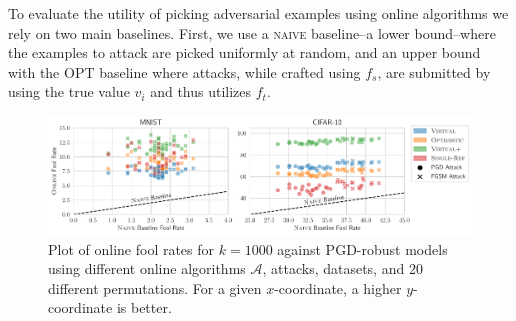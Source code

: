 {}

 To evaluate the utility of picking adversarial examples  using  online  algorithms  we  rely  on  two  main baselines. First, we use a \textsc{naive} baseline--a lower bound--where the examples to attack are picked uniformly at random, and an upper bound with the \textsc{OPT} baseline where attacks, while crafted using $f_s$, are submitted by using the true value $v_i$ and thus utilizes $f_t$.%
\setlength{\textfloatsep}{5pt}%
\begin{figure}[t]
    \centering
    \includegraphics[width=.9\linewidth]{Figures/scatterplot_Q1.pdf}
    \caption{ \small
    Plot of online fool rates for $k=1000$ against PGD-robust models using different online algorithms $\mathcal{A}$, attacks, datasets, and $20$ different permutations. For a given $x$-coordinate, a higher $y$-coordinate is better.} %
    \label{fig:scatter}
\end{figure}

